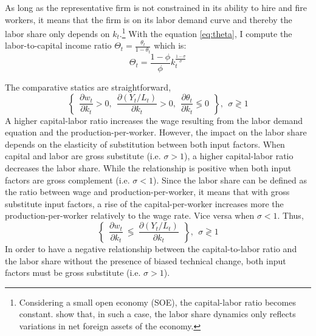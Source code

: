 As long as the representative firm is not constrained in its ability to hire and fire workers, it means that the firm is on its labor demand curve and thereby the labor share only depends on $k_t$.\footnote{Considering a small open economy (SOE), the capital-labor ratio becomes constant. \cite{Schmidt2013} show that, in such a case, the labor share dynamics only reflects variations in net foreign assets of the economy.}
With the equation \eqref{eq:theta}, I compute the labor-to-capital income ratio $\Theta_t = \frac{\theta_t}{1-\theta_t}$ which is:
\begin{equation}\label{eq:Theta}
	\Theta_t = \frac{1-\phi}{\phi}k_t^{\frac{1-\sigma}{\sigma}}
\end{equation} 

The comparative statics are straightforward,
	\begin{equation*}
		\left\lbrace ~~
		\frac{\partial w_t}{\partial k_t} > 0,~~
		\frac{\partial (Y_t/L_t)}{\partial k_t} > 0,~~
		\frac{\partial \theta_t}{\partial k_t} \lessgtr 0 ~~
		\right\rbrace, ~~ \sigma \gtrless 1
	\end{equation*}
A higher capital-labor ratio increases the wage resulting from the labor demand equation and the production-per-worker. However, the impact on the labor share depends on the elasticity of substitution between both input factors. When capital and labor are gross substitute (i.e. $\sigma > 1$), a higher capital-labor ratio decreases the labor share. While the relationship is positive when both input factors are gross complement (i.e. $\sigma < 1$). Since the labor share can be defined as the ratio between wage and production-per-worker, it means that with gross substitute input factors, a rise of the capital-per-worker increases more the production-per-worker relatively to the wage rate. Vice versa when $\sigma <1$. Thus,
	\begin{equation*}
		\left\lbrace ~~
		\frac{\partial w_t}{\partial k_t} ~\lessgtr~ \frac{\partial (Y_t/L_t)}{\partial k_t} ~~
		\right\rbrace, ~~ \sigma \gtrless 1
	\end{equation*}
In order to have a negative relationship between the capital-to-labor ratio and the labor share without the presence of biased technical change, both input factors must be gross substitute (i.e. $\sigma >1$).

